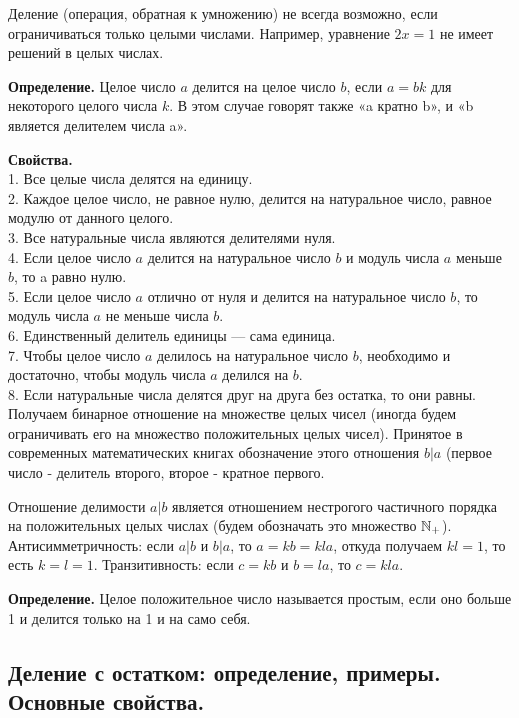 \documentclass[a4paper, 10pt]{article}
\begin{document}
Деление (операция, обратная к умножению) не всегда возможно, если ограничиваться только целыми числами. Например, уравнение $2x = 1$ не имеет решений в целых числах.

\textbf{Определение.} Целое число $a$ делится на целое число $b$, если $a = bk$ для некоторого целого числа $k$. В этом случае говорят также «a кратно b», и «b является делителем числа a».

\textbf{Свойства.} \\
1. Все целые числа делятся на единицу. \\
2. Каждое целое число, не равное нулю, делится на натуральное число, равное модулю от данного целого. \\
3. Все натуральные числа являются делителями нуля. \\
4. Если целое число $a$ делится на натуральное число $b$ и модуль числа $a$ меньше $b$, то a равно нулю. \\
5. Если целое число $a$ отлично от нуля и делится на натуральное число $b$, то модуль числа $a$ не меньше числа $b$. \\
6. Единственный делитель единицы — сама единица. \\
7. Чтобы целое число $a$ делилось на натуральное число $b$, необходимо и достаточно, чтобы модуль числа $a$ делился на $b$. \\
8. Если натуральные числа делятся друг на друга без остатка, то они равны. \\

Получаем бинарное отношение на множестве целых чисел (иногда будем ограничивать его на множество положительных целых чисел). Принятое в современных математических книгах обозначение этого отношения $b | a$ (первое число - делитель второго, второе - кратное первого.

Отношение делимости $a | b$ является отношением нестрогого частичного порядка на положительных целых числах (будем обозначать это множество $\mathbb{N}_+$). Антисимметричность: если $a | b$ и $b | a$, то $a = kb = kla$, откуда получаем $kl = 1$, то есть $k = l = 1$. Транзитивность: если $c = kb$ и $b = la$, то $c = kla$.

\textbf{Определение.} Целое положительное число называется простым, если оно больше 1 и делится только на 1 и на само себя.



\subsection{Деление с остатком: определение, примеры. Основные свойства.}
\end{document}
